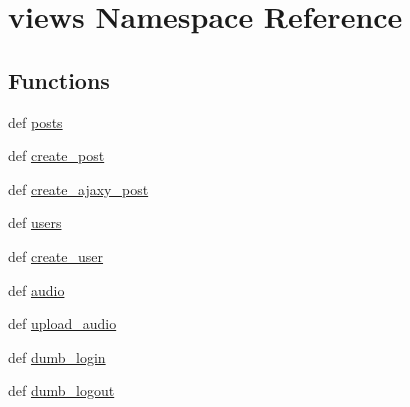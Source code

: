 \hypertarget{namespaceviews}{
\section{views Namespace Reference}
\label{namespaceviews}
}
\subsection*{Functions}
\begin{DoxyCompactItemize}
\item 
def \hyperlink{namespaceviews_a8ae77b935eb0c2b373c96ea7fed65005}{posts}
\item 
def \hyperlink{namespaceviews_af0598536d0361552ee2baae2ddfb3ab4}{create\_\-post}
\item 
def \hyperlink{namespaceviews_a1e867896f092c96fc1da4aebdb253899}{create\_\-ajaxy\_\-post}
\item 
def \hyperlink{namespaceviews_af76c31c4a1d1ec09edef40d58d7aee4e}{users}
\item 
def \hyperlink{namespaceviews_a2aadc5f33754c61a4ad46f0d2a0c682d}{create\_\-user}
\item 
def \hyperlink{namespaceviews_abbf19790bbcab4fd510b87a23070dfa6}{audio}
\item 
def \hyperlink{namespaceviews_acae14ae57c49a06abe9d3d1ab5bb5078}{upload\_\-audio}
\item 
def \hyperlink{namespaceviews_a7b7db137d1dcd7db8182fde7214a39c4}{dumb\_\-login}
\item 
def \hyperlink{namespaceviews_a40f03adbfc8628b61cac8b9fb9cb655a}{dumb\_\-logout}
\end{DoxyCompactItemize}


